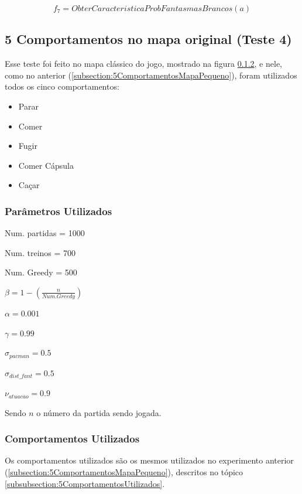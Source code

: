 $$ f_7 = ObterCaracteristicaProbFantasmasBrancos \left( a \right) $$

\subsection{5 Comportamentos no mapa original (Teste 4)} \label{subsection:5ComportamentosMapaOriginal}

Esse teste foi feito no mapa clássico do jogo, mostrado na figura \ref{}, e nele, como no anterior (\ref{subsection:5ComportamentosMapaPequeno}), foram utilizados todos os cinco comportamentos:

\begin{itemize}
	\item Parar
	\item Comer
	\item Fugir
	\item Comer Cápsula
	\item Caçar
\end{itemize}

\subsubsection{Parâmetros Utilizados}

\begin{multicols}{2}

Num. partidas = 1000

Num. treinos = 700

Num. Greedy = 500

$ \beta = 1 - \left( \frac{n}{Num. Greedy} \right) $

$ \alpha = 0.001 $

$ \gamma = 0.99 $

$ \sigma_{pacman} = 0.5 $

$ \sigma_{dist\_fant} = 0.5 $

$ \nu_{atuacao} = 0.9 $

\end{multicols}

Sendo $ n $ o número da partida sendo jogada.


\subsubsection{Comportamentos Utilizados}

Os comportamentos utilizados são os mesmos utilizados no experimento anterior (\ref{subsection:5ComportamentosMapaPequeno}), descritos no tópico \ref{subsubsection:5ComportamentosUtilizados}.

